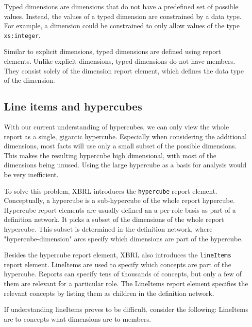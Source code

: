 Typed dimensions are dimensions that do not have a predefined set of possible values.
Instead, the values of a typed dimension are constrained by a data type.
For example, a dimension could be constrained to only allow values of the type \texttt{xs:integer}.

Similar to explicit dimensions, typed dimensions are defined using report elements.
Unlike explicit dimensions, typed dimensions do not have members.
They consist solely of the dimension report element, which defines the data type of the dimension.

\subsection{Line items and hypercubes}

With our current understanding of hypercubes, we can only view the whole report as a single, gigantic hypercube.
Especially when considering the additional dimensions, most facts will use only a small subset of the possible dimensions.
This makes the resulting hypercube high dimensional, with most of the dimensions being unused.
Using the large hypercube as a basis for analysis would be very inefficient.

To solve this problem, XBRL introduces the \texttt{hypercube} report element.
Conceptually, a hypercube is a sub-hypercube of the whole report hypercube.
Hypercube report elements are usually defined an a per-role basis as part of a definition network.
It picks a subset of the dimensions of the whole report hypercube.
This subset is determined in the definition network, where "hypercube-dimension" arcs specify which dimensions are part of the hypercube.

Besides the hypercube report element, XBRL also introduces the \texttt{lineItems} report element.
LineItems are used to specify which concepts are part of the hypercube.
Reports can specify tens of thousands of concepts, but only a few of them are relevant for a particular role.
The LineItems report element specifies the relevant concepts by listing them as children in the definition network.

If understanding lineItems proves to be difficult, consider the following: 
LineItems are to concepts what dimensions are to members.

